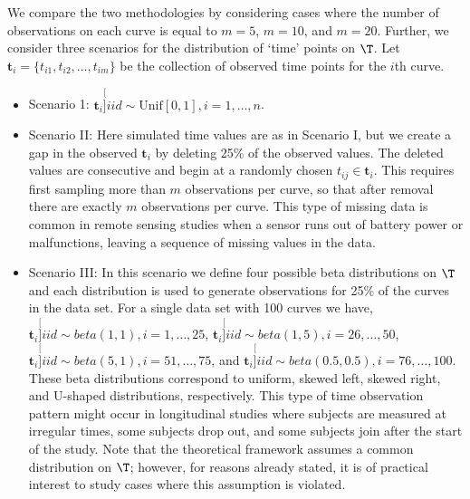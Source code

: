We compare the two methodologies by considering cases where the number of observations on each curve is equal to $m=5$, $m=10$, and $m=20$. Further, we consider three scenarios for the distribution of `time' points on $\T$. Let $\textbf{t}_i = \{t_{i1}, t_{i2}, \dots, t_{im}\}$ be the collection of observed time points for the $i$th curve. 
\begin{itemize}
	\item Scenario 1: $\textbf{t}_i \stackrel[]{iid}{\sim} \mbox{Unif}[0,1], i = 1, \dots, n$. 
	\item Scenario II: Here simulated time values are as in Scenario I, but we create a gap in the observed $\textbf{t}_i$ by deleting 25\% of the observed values. The deleted values are consecutive and begin at a randomly chosen $t_{ij} \in \textbf{t}_i$. This requires first sampling more than $m$ observations per curve, so that after removal there are exactly $m$ observations per curve. This type of missing data is common in remote sensing studies when a sensor runs out of battery power or malfunctions, leaving a sequence of missing values in the data. 
	\item Scenario III: In this scenario we define four possible beta distributions on $\T$ and each distribution is used to generate observations for 25\% of the curves in the data set. For a single data set with 100 curves we have, $\textbf{t}_i \stackrel[]{iid}{\sim}beta(1,1), i = 1, \dots, 25$, $\textbf{t}_i \stackrel[]{iid}{\sim}beta(1,5), i = 26, \dots, 50$, $\textbf{t}_i \stackrel[]{iid}{\sim}beta(5,1), i = 51, \dots, 75$, and $\textbf{t}_i \stackrel[]{iid}{\sim}beta(0.5,0.5), i = 76, \dots, 100$. These beta distributions correspond to uniform, skewed left, skewed right, and U-shaped distributions, respectively. This type of time observation pattern might occur in longitudinal studies where subjects are measured at irregular times, some subjects drop out, and some subjects join after the start of the study. Note that the theoretical framework assumes a common distribution on $\T$; however, for reasons already stated, it is of practical interest to study cases where this assumption is violated. 
\end{itemize}

